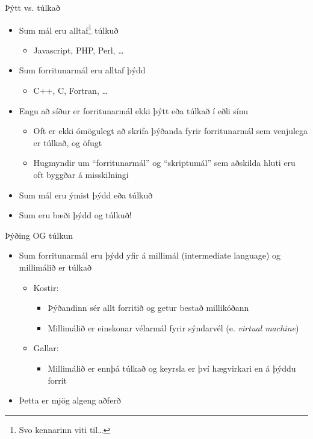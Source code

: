 \documentclass{beamer}
\begin{document}
\begin{frame}{Þýtt vs. túlkað}
\begin{itemize}
 \item Sum mál eru alltaf\footnote{Svo kennarinn viti til\ldots} túlkuð
 \begin{itemize}
  \item Javascript, PHP, Perl, \ldots
 \end{itemize}
  \item Sum forritunarmál eru alltaf þýdd
 \begin{itemize}
  \item C++, C, Fortran, \ldots
 \end{itemize}
 \item Engu að síður er forritunarmál ekki þýtt eða túlkað í eðli sínu
 \begin{itemize}
  \item Oft er ekki ómögulegt að skrifa þýðanda fyrir forritunarmál sem venjulega er túlkað, og öfugt
  \item Hugmyndir um ``forritunarmál'' og ``skriptumál'' sem aðskilda hluti eru oft byggðar á misskilningi
 \end{itemize}
 \item Sum mál eru ýmist þýdd eða túlkuð
 \item Sum eru bæði þýdd og túlkuð!
\end{itemize}
\end{frame}

\begin{frame}{Þýðing OG túlkun}
\begin{itemize}
 \item Sum forritunarmál eru þýdd yfir á millimál (intermediate language) og millimálið er túlkað
 \begin{itemize}
  \item Kostir:
  \begin{itemize}
   \item Þýðandinn sér allt forritið og getur bestað millikóðann
   \item Millimálið er einskonar vélarmál fyrir sýndarvél (e. \emph{virtual machine})
  \end{itemize}
  \item Gallar:
  \begin{itemize}
   \item Millimálið er ennþá túlkað og keyrsla er því hægvirkari en á þýddu forrit
  \end{itemize}
 \end{itemize}
 \item Þetta er mjög algeng aðferð
\end{itemize}
\end{frame}
\end{document}
